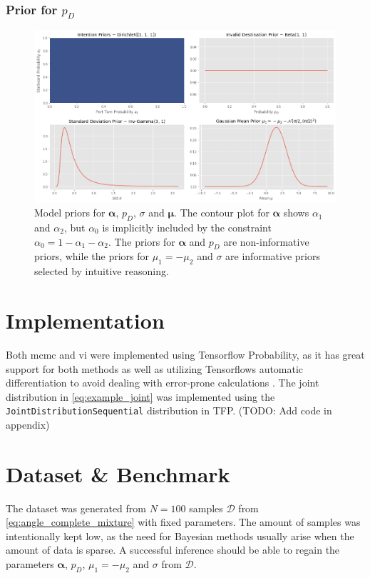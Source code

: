 \subsubsection{Prior for $p_D$}
\begin{figure}
    \centering
    \includegraphics[width=1\textwidth]{figures/priors.png}
    \caption{Model priors for $\boldsymbol{\alpha}$, $p_D$, $\sigma$ and $\boldsymbol{\mu}$. The contour plot for $\boldsymbol{\alpha}$ shows $\alpha_1$ and $\alpha_2$, but $\alpha_0$ is implicitly included by the constraint $\alpha_0 = 1 - \alpha_1 - \alpha_2$. The priors for $\boldsymbol{\alpha}$ and $p_D$ are non-informative priors, while the priors for $\mu_1 = -\mu_2$ and $\sigma$ are informative priors selected by intuitive reasoning.}
    \label{fig:priors}
\end{figure}

\section{Implementation}
Both \acrshort{mcmc} and \acrshort{vi} were implemented using Tensorflow Probability, as it has great support for both methods as well as utilizing Tensorflows automatic differentiation to avoid dealing with error-prone calculations \cite{tensorflow2015-whitepaper}. The joint distribution in \cref{eq:example_joint} was implemented using the \texttt{JointDistributionSequential} distribution in TFP. (TODO: Add code in appendix)


\section{Dataset \& Benchmark}
The dataset was generated from $N=100$ samples $\mathcal{D}$ from \cref{eq:angle_complete_mixture} with fixed parameters. The amount of samples was intentionally kept low, as the need for Bayesian methods usually arise when the amount of data is sparse. A successful inference should be able to regain the parameters $\boldsymbol{\alpha}$, $p_D$, $\mu_1 = -\mu_2$ and $\sigma$ from $\mathcal{D}$.

